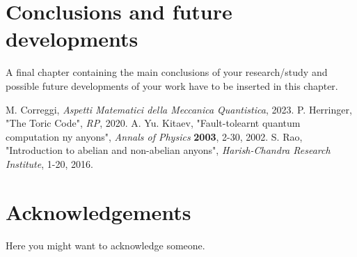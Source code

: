 \documentclass{Configuration_Files/PoliMi3i_thesis}
\begin{document}
\chapter{Conclusions and future developments}
\label{ch:conclusions}%
A final chapter containing the main conclusions of your research/study
and possible future developments of your work have to be inserted in this chapter.


\begin{thebibliography}{99} %
	 M. Correggi, \textit{Aspetti Matematici della Meccanica Quantistica}, 2023.
	 P. Herringer, "The Toric Code", {\it RP}, 2020.
	 A. Yu. Kitaev, "Fault-tolearnt quantum computation ny anyons", {\it Annals of Physics} {\bf 2003}, 2-30, 2002.
	 S. Rao, "Introduction to abelian and non-abelian anyons", {\it Harish-Chandra Research Institute}, 1-20, {2016}.
\end{thebibliography}



\cleardoublepage
{} %


\listoffigures



\chapter*{Acknowledgements}
Here you might want to acknowledge someone.

\cleardoublepage
\end{document}
